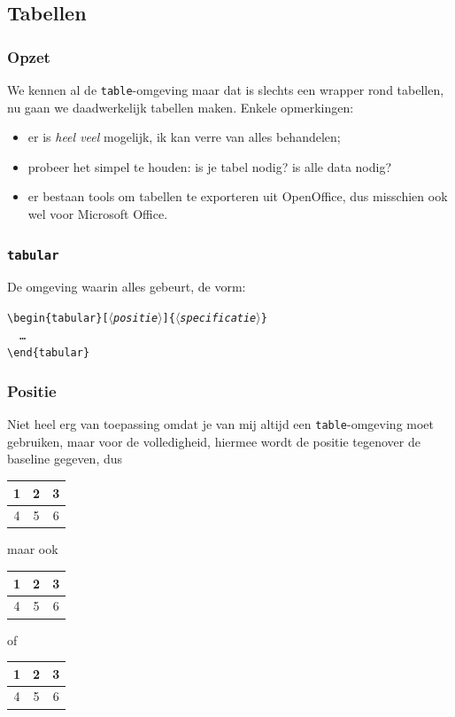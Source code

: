 \subsection{Tabellen}
\begin{frame}[fragile]
  \frametitle{Opzet}

  We kennen al de \verb|table|-omgeving maar dat is slechts een wrapper rond tabellen, nu gaan we daadwerkelijk tabellen maken. Enkele opmerkingen:
  \begin{itemize}
    \item er is \emph{heel veel} mogelijk, ik kan verre van alles behandelen;
    \item probeer het simpel te houden: is je tabel nodig? is alle data nodig?
    \item er bestaan tools om tabellen te exporteren uit OpenOffice, dus misschien ook wel voor Microsoft Office.
  \end{itemize}
\end{frame}

\begin{frame}
  \frametitle{\texttt{tabular}}

  De omgeving waarin alles gebeurt, de vorm:

  \texttt{\textbackslash begin\{tabular\}[$\langle$\textsl{positie}$\rangle$]\{$\langle$\textsl{specificatie}$\rangle$\}} \\
  \ \ \texttt{\ldots} \\
  \texttt{\textbackslash end\{tabular\}}
\end{frame}

\begin{frame}[fragile]
  \frametitle{Positie}

  Niet heel erg van toepassing omdat je van mij altijd een \verb|table|-omgeving moet gebruiken, maar voor de volledigheid, hiermee wordt de positie tegenover de baseline gegeven, dus
  \begin{tabular}[b]{ccc}
    1 & 2 & 3 \\\midrule
    4 & 5 & 6
  \end{tabular}
  maar ook
  \begin{tabular}[c]{ccc}
    1 & 2 & 3 \\\midrule
    4 & 5 & 6
  \end{tabular}
  of
  \begin{tabular}[t]{ccc}
    1 & 2 & 3 \\\midrule
    4 & 5 & 6
  \end{tabular}
\end{frame}

